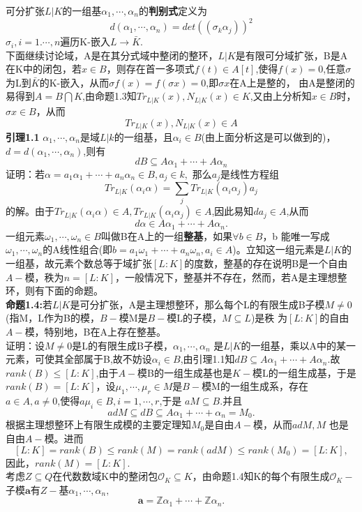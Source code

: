 \documentclass[UTF8]{article}
\begin{document}
	可分扩张$L|K$的一组基$ \alpha_{1},\cdots ,\alpha_{n}$的\textbf{判别式}定义为
	$$d(\alpha_{1},\cdots
	 ,\alpha_{n})=det((\sigma_{k}\alpha_{j}))^{2}$$
	$\sigma_{i},i=1.\cdots ,n$遍历K-嵌入$L\rightarrow \bar{K}$.\\
	下面继续讨论域，A是在其分式域中整闭的整环，$L|K$是有限可分域扩张，B是A在K中的闭包，若$x\in B$，则存在首一多项式$f(t)\in A[t]$,使得$f(x)=0$,任意$\sigma$为L到$\bar{K}$的K-嵌入，从而$\sigma f(x)=f(\sigma x)=0$,即$\sigma x$在A上是整的，
	由A是整闭的易得到$A=B\bigcap K$,由命题1.3知$Tr_{L|K}(x),N_{L|K}(x)
    \in K$,又由上分析知$x\in B$时，$\sigma x \in B$，从而$$	Tr_{L|K}(x),N_{L|K}(x)\in A$$
	\textbf{引理1.1} $\alpha_1,\cdots,\alpha_n$是域$L|k$的一组基，且$\alpha_{i}\in B$(由上面分析这是可以做到的)，$d=d(\alpha_1,\cdots ,\alpha_n)$,则有
    $$dB\subseteq A\alpha_1+\cdots+A\alpha_n$$
	证明：若$\alpha=a_{1}\alpha_1+\cdots +a_{n}\alpha_{n}\in B,a_{j}\in k,$
	那么$a_{j}$是线性方程组$$
	Tr_{L|K}(\alpha_{i}\alpha)=\sum_{j}Tr_{L|K}(\alpha_{i}\alpha_{j})a_{j}$$的解。由于$Tr_{L|K}(\alpha_{i}\alpha)\in A,
	Tr_{L|K}(\alpha_{i}\alpha_{j})\in A$,因此易知$da_{j}\in A$,从而$$
	d\alpha \in A\alpha_{1}+\cdots+A\alpha_{n}. $$
	一组元素$\omega_{1},\cdots ,\omega_{n} \in B$叫做B在A上的一组\textbf{整基}，如果$\forall b \in B$，b 能唯一写成	$\omega_{1},\cdots ,\omega_{n}$的A线性组合(即$b=a_{1}\omega_{1}+\cdots +a_{n}\omega_{n},a_{i}\in A$)。立知这一组元素是$L|K$的一组基，故元素个数总等于域扩张$[L:K]$的度数，整基的存在说明B是一个自由$A-$模，秩为$n=[L:K]$，一般情况下，整基并不存在，然而，若A是主理想整环，则有下面的命题。\\
	\textbf{命题1.4:}若$L|K$是可分扩张，A是主理想整环，那么每个L的有限生成B子模$M\neq 0$(指M，L作为B的模，$B-$模M是$B-$模L的子模，$M\subseteq L$)是秩
	为$[L:K]$的自由$A-$模，特别地，B在A上存在整基。\\
	证明：设$M\neq 0$是L的有限生成B子模，$\alpha_{1},\cdots,\alpha_{n}$
	是$L|K$的一组基，乘以A中的某一元素，可使其全部属于B,故不妨设$\alpha_{i} \in B$,由引理1.1知$dB\subseteq A\alpha_{1}+\cdots +A\alpha_{n}.$故
	$rank(B)\leq [L:K]$,由于$A-$模B的一组生成基也是$K-$模L的一组生成基，于是$rank(B)=[L:K]$，设$\mu_{1},\cdots,\mu_{r}\in M$是$B-$模M的一组生成系，存在$a \in A ,a\neq 0$,使得$a\mu_{i}\in B,i=1,\cdots ,r$,于是
	$aM\subseteq B$.并且$$adM \subseteq dB \subseteq A\alpha_{1}+\cdots +\alpha_{n}=M_{0} .$$
	根据主理想整环上有限生成模的主要定理知$M_{0}$是自由$A-$模，从而$adM,M$ 也是自由$A-$模。进而$$
	[L:K]=rank(B)\leq rank(M)=rank(adM)\leq rank(M_{0})=[L:K],
	$$
	因此，$rank(M)=[L:K].$\\
    考虑$Z\subseteq Q$在代数数域K中的整闭包$\mathcal{O}_{K}\subseteq K$，由命题1.4知K的每个有限生成$\mathcal{O}_{K}-$子模$\textbf{a}$有$Z-$基$\alpha_{1},\cdots,\alpha_{n},$ $$\textbf{a}=\mathbb{Z}\alpha_{1}+\cdots+\mathbb{Z}\alpha_{n}.$$
\end{document}
